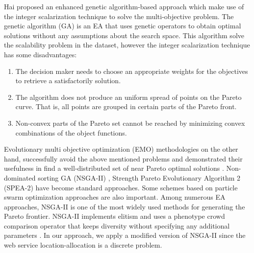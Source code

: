 \documentclass[twoside]{article}
\begin{document}
Hai \cite{EnhancedGenetic} proposed an enhanced genetic algorithm-based approach which make use of the integer scalarization technique to solve the multi-objective problem.
The genetic algorithm (GA) is an EA that uses genetic operators to obtain optimal solutions without any assumptions about the search space.
This algorithm solve the scalability problem in the dataset, however the integer scalarization technique \cite{Multiobjective} has some disadvantages: 

\begin{enumerate}
	\item The decision maker needs to choose an appropriate weights for the objectives to retrieve a satisfactorily solution.
	\item The algorithm does not produce an uniform spread of points on the Pareto curve. That is, all points are grouped in certain parts of the Pareto front.
	\item Non-convex parts of the Pareto set cannot be reached by minimizing convex combinations of the object functions.
\end{enumerate}

Evolutionary multi objective optimization (EMO) methodologies on the other hand, successfully avoid the above mentioned problems and demonstrated their usefulness in find a well-distributed set of near Pareto optimal solutions \cite{Aboolian200964}. Non-dominated sorting GA (NSGA-II) \cite{996017}, Strength Pareto Evolutionary Algorithm 2 (SPEA-2) \cite{Deb:2005:EED:1109044.1109049} have become standard approaches. 
Some schemes based on particle swarm optimization approaches \cite{Elhossini:2010:SPP:1739146.1739151, Huang:2006:CLP:1108677.1108683} are also important. 
Among numerous EA approaches, NSGA-II is one of the most widely used methods for generating the Pareto frontier. 
NSGA-II implements elitism and uses a phenotype crowd comparison operator that keeps diversity without specifying any additional parameters \cite{Deb06referencepoint}.
In our approach, we apply a modified version of NSGA-II since the web service location-allocation is a discrete problem. 
\end{document}
